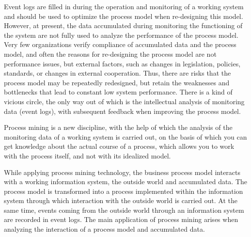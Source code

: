 \documentclass[
11pt,%
tightenlines,%
twoside,%
onecolumn,%
nofloats,%
nobibnotes,%
nofootinbib,%
superscriptaddress,%
noshowpacs,%
centertags]%
{revtex4}
\begin{document}
Event logs are filled in during the operation and monitoring of a working system and should be used to optimize the process model when re-designing this model.
However, at present, the data accumulated during monitoring the functioning of the system are not fully used to analyze the performance of the process model.
Very few organizations verify compliance of accumulated data and the process model, and often the reasons for re-designing the process model are not performance issues, but external factors, such as changes in legislation, policies, standards, or changes in external cooperation.
Thus, there are risks that the process model may be repeatedly redesigned, but retain the weaknesses and bottlenecks that lead to constant low system performance.
There is a kind of vicious circle, the only way out of which is the intellectual analysis of monitoring data (event logs), with subsequent feedback when improving the process model.

Process mining is a new discipline, with the help of which the analysis of the monitoring data of a working system is carried out, on the basis of which you can get knowledge about the actual course of a process, which allows you to work with the process itself, and not with its idealized model.

While applying process mining technology, the business process model interacts with a working information system, the outside world and accumulated data.
The process model is transformed into a process implemented within the information system through which interaction with the outside world is carried out.
At the same time, events coming from the outside world through an information system are recorded in event logs.
The main application of process mining arises when analyzing the interaction of a process model and accumulated data.
\end{document}
